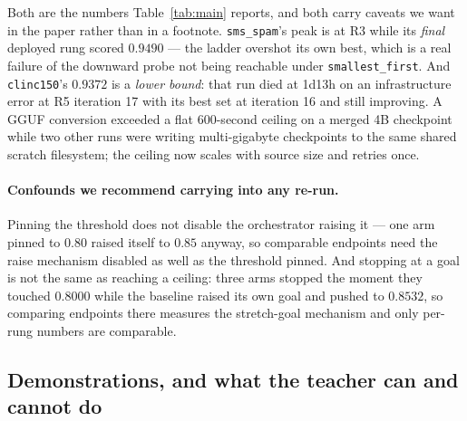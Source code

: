 \documentclass[sigconf,10pt]{acmart}
\newcommand{\tsk}[1]{\texttt{#1}}
\begin{document}
Both are the numbers Table~\ref{tab:main} reports, and both carry caveats we want in the
paper rather than in a footnote. \tsk{sms\_spam}'s peak is at R3 while its \emph{final}
deployed rung scored $0.9490$ --- the ladder overshot its own best, which is a real failure of
the downward probe not being reachable under \texttt{smallest\_first}. And \tsk{clinc150}'s
$0.9372$ is a \emph{lower bound}: that run died at 1d13h on an infrastructure error at R5
iteration 17 with its best set at iteration 16 and still improving. A GGUF conversion exceeded
a flat 600-second ceiling on a merged 4B checkpoint while two other runs were writing
multi-gigabyte checkpoints to the same shared scratch filesystem; the ceiling now scales with
source size and retries once.

\paragraph{Confounds we recommend carrying into any re-run.} Pinning the threshold does not
disable the orchestrator raising it --- one arm pinned to $0.80$ raised itself to $0.85$
anyway, so comparable endpoints need the raise mechanism disabled as well as the threshold
pinned. And stopping at a goal is not the same as reaching a ceiling: three arms stopped the
moment they touched $0.8000$ while the baseline raised its own goal and pushed to $0.8532$,
so comparing endpoints there measures the stretch-goal mechanism and only per-rung numbers are
comparable.

\subsection{Demonstrations, and what the teacher can and cannot do}
\label{sec:ablations-fewshot}
\end{document}

